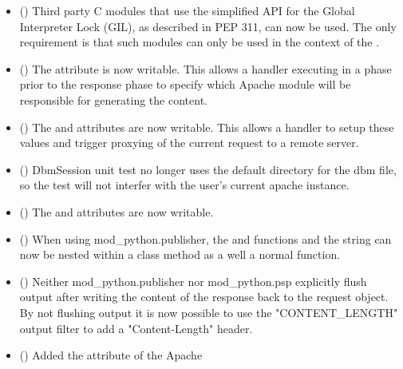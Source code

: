   \begin{itemize}
    \item
      ()
      Third party C modules that use the simplified API for the Global
      Interpreter Lock (GIL), as described in PEP 311, can now be used. The
      only requirement is that such modules can only be used in the context
      of the .
    \item
      ()
      The  attribute is now writable. This allows a handler
      executing in a phase prior to the response phase to specify which
      Apache module will be responsible for generating the content.
    \item
      ()
      The  and  attributes are now writable.
      This allows a handler to setup these values and trigger proxying of the
      current request to a remote server.
    \item
      ()
      DbmSession unit test no longer uses the default directory for the dbm file,
      so the test will not interfer with the user's current apache instance.
    \item
      ()
      The  and  attributes are
      now writable.
    \item
      ()
      When using mod_python.publisher, the  and
       functions and the  string
      can now be nested within a class method as a well a normal function.
    \item
      ()
      Neither mod_python.publisher nor mod_python.psp explicitly flush
      output after writing the content of the response back to the request
      object. By not flushing output it is now possible to use the
      "CONTENT_LENGTH" output filter to add a "Content-Length" header.
    \item
      ()
      Added the  attribute of the Apache 

\end{itemize}
